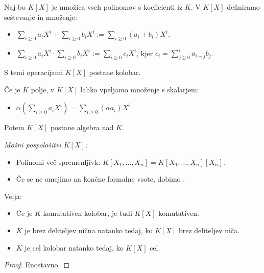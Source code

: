 \begin{zgled}
\begin{itemize}
        Naj bo $K[X]$ je množica vseh polinomov s koeficienti iz $K$. V $K[X]$ definiramo seštevanje in množenje:
        \begin{itemize}
            \item $\sum_{i \geq 0} a_iX^i + \sum_{i \geq 0} b_iX^i := \sum_{i \geq 0} (a_i + b_i)X^i$.
            \item $\sum_{i \geq 0} a_iX^i \cdot \sum_{i \geq 0} b_iX^i := \sum_{i \geq 0} c_iX^i$, kjer $c_i = \sum_{j \geq 0}^{i} a_{i - j} b_j$.
        \end{itemize}
        S temi operacijami $K[X]$ postane kolobar.
        \begin{opomba}
            Če je $K$ polje, v $K[X]$ lahko vpeljamo množenje s skalarjem:
            \begin{itemize}
                \item $\alpha (\sum_{i \geq 0} a_iX^i) = \sum_{i \geq 0} (\alpha a_i)X^i$
            \end{itemize} 
            Potem $K[X]$ postane algebra nad $K$.
        \end{opomba}
        \emph{Možni pospološitvi $K[X]$:}
        \begin{itemize}
            \item Polinomi več spremenljivk: $K[X_1, \ldots, X_n] = K[X_1, \ldots, X_n][X_n]$.
            \item Če se ne omejimo na končne formalne vsote, dobimo .
        \end{itemize}        
    \end{itemize}    
\end{zgled}
\begin{trditev}
    Velja:
    \begin{itemize}
        \item Če je $K$ komutativen kolobar, je tudi $K[X]$ komutativen.
        \item $K$ je brez deliteljev nična natanko tedaj, ko $K[X]$ brez deliteljev niča.
        \item $K$ je cel kolobar natanko tedaj, ko $K[X]$ cel.
    \end{itemize}
\end{trditev}

\begin{proof}
    Enostavno.
\end{proof}
